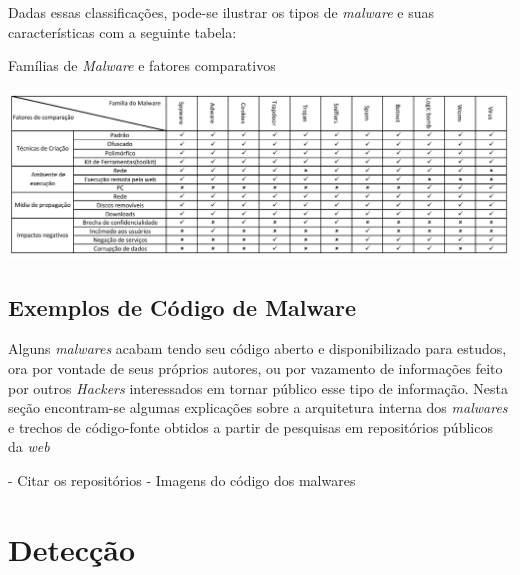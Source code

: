 Dadas essas classificações, pode-se ilustrar os tipos de \textit{malware} e suas características com a seguinte tabela:
%
\begin{table}[h]
\caption{\small Famílias de \textit{Malware} e fatores comparativos}
\centering
\includegraphics{figs/tabela.pdf}
\label{f.tabelamalware}
\end{table}
\subsection{Exemplos de Código de Malware} %
\label{ssub:exemplos_malware}

Alguns \textit{malwares} acabam tendo seu código aberto e disponibilizado para estudos, ora por vontade de seus próprios autores, ou por vazamento de informações feito por outros \textit{Hackers} interessados em tornar público esse tipo de informação. Nesta seção encontram-se algumas explicações sobre a arquitetura interna dos \textit{malwares} e trechos de código-fonte obtidos a partir de pesquisas em repositórios públicos da \textit{web} 

- Citar os repositórios
- Imagens do código dos malwares



\section{Detecção}
\label{s.deteccao}

